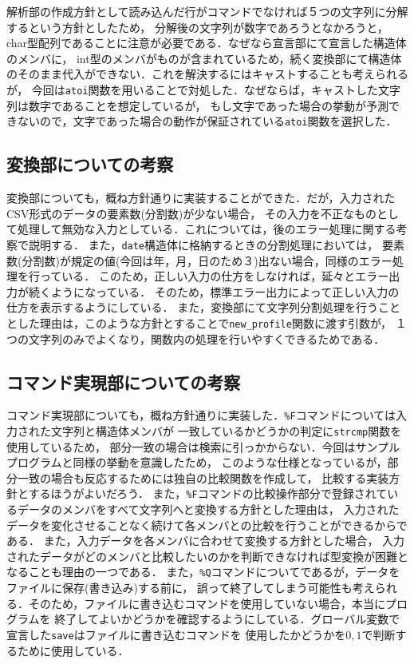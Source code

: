 \documentclass[a4paper,11pt]{jarticle}
\begin{document}
解析部の作成方針として読み込んだ行がコマンドでなければ５つの文字列に分解するという方針としたため，
分解後の文字列が数字であろうとなかろうと，char型配列であることに注意が必要である．なぜなら宣言部にて宣言した構造体のメンバに，
int型のメンバがものが含まれているため，続く変換部にて構造体のそのまま代入ができない．これを解決するにはキャストすることも考えられるが，
今回は\verb|atoi|関数を用いることで対処した．なぜならば，キャストした文字列は数字であることを想定しているが，
もし文字であった場合の挙動が予測できないので，文字であった場合の動作が保証されている\verb|atoi|関数を選択した．

\subsection{変換部についての考察}

変換部についても，概ね方針通りに実装することができた．だが，入力されたCSV形式のデータの要素数(分割数)が少ない場合，
その入力を不正なものとして処理して無効な入力としている．これについては，後のエラー処理に関する考察で説明する．
また，\verb|date|構造体に格納するときの分割処理においては，
要素数(分割数)が規定の値(今回は年，月，日のため３)出ない場合，同様のエラー処理を行っている．
このため，正しい入力の仕方をしなければ，延々とエラー出力が続くようになっている．
そのため，標準エラー出力によって正しい入力の仕方を表示するようにしている．
また，変換部にて文字列分割処理を行うこととした理由は，このような方針とすることで\verb|new_profile|関数に渡す引数が，
１つの文字列のみでよくなり，関数内の処理を行いやすくできるためである．

\subsection{コマンド実現部についての考察}

コマンド実現部についても，概ね方針通りに実装した．\verb|%F|コマンドについては入力された文字列と構造体メンバが
一致しているかどうかの判定に\verb|strcmp|関数を使用しているため，
部分一致の場合は検索に引っかからない．今回はサンプルプログラムと同様の挙動を意識したため，
このような仕様となっているが，部分一致の場合も反応するためには独自の比較関数を作成して，
比較する実装方針とするほうがよいだろう．
また，\verb|%F|コマンドの比較操作部分で登録されているデータのメンバをすべて文字列へと変換する方針とした理由は，
入力されたデータを変化させることなく続けて各メンバとの比較を行うことができるからである．
また，入力データを各メンバに合わせて変換する方針とした場合，
入力されたデータがどのメンバと比較したいのかを判断できなければ型変換が困難となることも理由の一つである．
また，\verb|%Q|コマンドについてであるが，データをファイルに保存(書き込み)する前に，
誤って終了してしまう可能性も考えられる．そのため，ファイルに書き込むコマンドを使用していない場合，本当にプログラムを
終了してよいかどうかを確認するようにしている．グローバル変数で宣言した\verb|save|はファイルに書き込むコマンドを
使用したかどうかを$0,1$で判断するために使用している．
\end{document}
